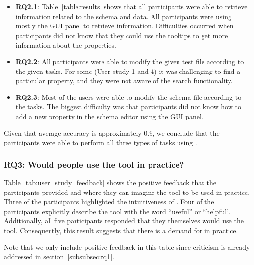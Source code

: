 \begin{itemize}
    \item \textbf{RQ2.1}: Table~\ref{table:results} shows that all
    participants were able to retrieve information related to the schema and data.
    All participants were using mostly the GUI panel to retrieve information.
    Difficulties occurred when participants did not know that they could use the tooltips to get more information about the properties.
    \item \textbf{RQ2.2}: All participants were able to modify the given test file according to the given tasks.
    For some (User study 1 and 4) it was challenging to find a particular property, and they were not aware of the search functionality.
    \item \textbf{RQ2.3}: Most of the users were able to modify the schema file according to the tasks.
    The biggest difficulty was that participants did not know how to add a new property in the schema editor using the GUI panel.
\end{itemize}

Given that average accuracy is approximately 0.9, we conclude that the participants were able to perform all three types of tasks using \toolname{}.

\subsubsection{\textbf{RQ3:} Would people use the tool in practice?} %
Table~\ref{tab:user_study_feedback} shows the positive feedback that the participants provided and where they can imagine the tool to be used in practice.
Three of the participants highlighted the intuitiveness of \toolname.
Four of the participants explicitly describe the tool with the word ``useful'' or ``helpful''.
Additionally, all five participants responded that they themselves would use the tool.
Consequently, this result suggests that there is a demand for \toolname{} in practice.

Note that we only include positive feedback in this table since criticism is already addressed in section~\ref{subsubsec:rq1}.


